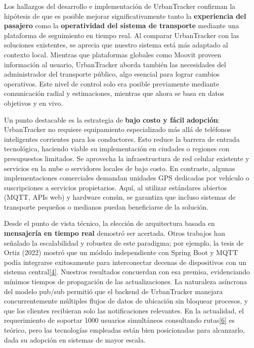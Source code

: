 \documentclass[
]{article}
\begin{document}
Los hallazgos del desarrollo e implementación de UrbanTracker confirman
la hipótesis de que es posible mejorar significativamente tanto la
\textbf{experiencia del pasajero} como la \textbf{operatividad del
sistema de transporte} mediante una plataforma de seguimiento en tiempo
real. Al comparar UrbanTracker con las soluciones existentes, se aprecia
que nuestro sistema está más adaptado al contexto local. Mientras que
plataformas globales como Moovit proveen información al usuario,
UrbanTracker aborda también las necesidades del administrador del
transporte público, algo esencial para lograr cambios operativos. Este
nivel de control solo era posible previamente mediante comunicación
radial y estimaciones, mientras que ahora se basa en datos objetivos y
en vivo.

Un punto destacable es la estrategia de \textbf{bajo costo y fácil
adopción}: UrbanTracker no requiere equipamiento especializado más allá
de teléfonos inteligentes corrientes para los conductores. Esto reduce
la barrera de entrada tecnológica, haciendo viable su implementación en
ciudades o regiones con presupuestos limitados. Se aprovecha la
infraestructura de red celular existente y servicios en la nube o
servidores locales de bajo costo. En contraste, algunas implementaciones
comerciales demandan unidades GPS dedicadas por vehículo o suscripciones
a servicios propietarios. Aquí, al utilizar estándares abiertos (MQTT,
APIs web) y hardware común, se garantiza que incluso sistemas de
transporte pequeños o medianos puedan beneficiarse de la solución.

Desde el punto de vista técnico, la elección de arquitectura basada en
\textbf{mensajería en tiempo real} demostró ser acertada. Otros trabajos
han señalado la escalabilidad y robustez de este paradigma; por ejemplo,
la tesis de Ortiz (2022) mostró que un módulo independiente con Spring
Boot y MQTT podía integrarse exitosamente para interconectar decenas de
dispositivos con un sistema
central\href{https://bibliotecadigital.udea.edu.co/entities/publication/3eb20d8e-dece-489f-8bcc-89f009b482cf\#:~:text=entre\%20las\%20m\%C3\%A1quinas\%20y\%20el,logrando\%20as\%C3\%AD\%20una\%20comunicaci\%C3\%B3n\%20bidireccional}{{[}4{]}}.
Nuestros resultados concuerdan con esa premisa, evidenciando mínimos
tiempos de propagación de las actualizaciones. La naturaleza asíncrona
del modelo pub/sub permitió que el backend de UrbanTracker manejara
concurrentemente múltiples flujos de datos de ubicación sin bloquear
procesos, y que los clientes recibieran solo las notificaciones
relevantes. En la actualidad, el requerimiento de soportar 1000 usuarios
simultáneos consultando
rutas\href{file://file-HuN9cjU571rmLYaT6jabAp\#:~:text=,2\%20segundos\%20tras\%20su\%20recepci\%C3\%B3n}{{[}6{]}}
es teórico, pero las tecnologías empleadas están bien posicionadas para
alcanzarlo, dada su adopción en sistemas de mayor escala.
\end{document}
